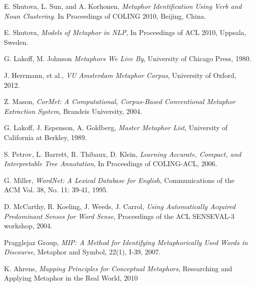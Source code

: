 \documentclass[12pt]{article}
\begin{document}
\newpage
\begin{thebibliography}{9}

  E. Shutova, L. Sun, and A. Korhonen,
  \emph{Metaphor Identification Using Verb and Noun Clustering}.
  In Proceedings of COLING 2010,
  Beijing, China.
  
  E. Shutova,
  \emph{Models of Metaphor in NLP},
  In Proceedings of ACL 2010,
  Uppsala, Sweden.
  
  G. Lakoff, M. Johnson
  \emph{Metaphors We Live By},
  University of Chicago Press, 1980.

  J. Herrmann, et al.,
  \emph{VU Amsterdam Metaphor Corpus},
  University of Oxford, 2012.

  Z. Mason,
  \emph{CorMet: A Computational, Corpus-Based Conventional Metaphor Extraction System},
  Brandeis University, 2004.

  G. Lakoff, J. Espenson, A. Goldberg,
  \emph{Master Metaphor List},
  University of California at Berkley, 1989.
  
  S. Petrov, L. Barrett, R. Thibaux, D. Klein,
  \emph{Learning Accurate, Compact, and Interpretable Tree Annotation},
  In Proceedings of COLING-ACL, 2006.

  G. Miller,
  \emph{WordNet: A Lexical Database for English},
  Communications of the ACM Vol. 38, No. 11: 39-41, 1995.

  D. McCarthy, R. Koeling, J. Weeds, J. Carrol,
  \emph{Using Automatically Acquired Predominant Senses for Word Sense},
  Proceedings of the ACL SENSEVAL-3 workshop, 2004.

  Pragglejaz Group,
  \emph{MIP: A Method for Identifying Metaphorically Used Words in Discourse},
  Metaphor and Symbol, 22(1), I-39, 2007.

  K. Ahrens,
  \emph{Mapping Principles for Conceptual Metaphors},
  Researching and Applying Metaphor in the Real World, 2010

\end{thebibliography}
\end{document}
